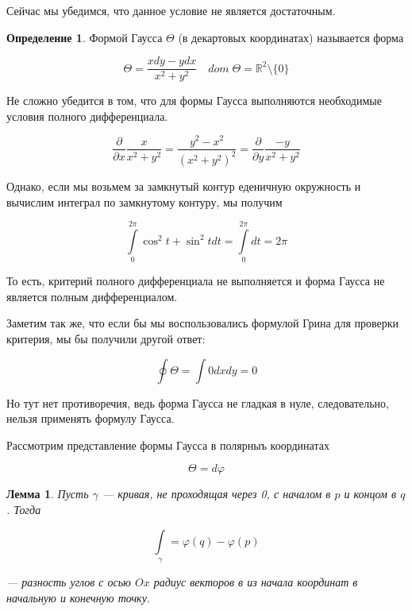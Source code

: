 \documentclass[a5paper]{article}
\newcounter{through}
\theoremstyle{plain}
\newtheorem{lemma}[through]{Лемма}
\theoremstyle{definition}
\newtheorem{definition}[through]{Определение}
\numberwithin{through}{section}
\numberwithin{equation}{section}
\begin{document}
Сейчас мы убедимся, что данное условие не является достаточным.

\begin{definition}
	Формой Гаусса $\Theta$ (в декартовых координатах) называется форма
	
	\begin{equation*}
		\Theta = \frac{xdy - ydx}{x^2 + y^2} \quad dom \; \Theta = \mathbb{R}^2 \setminus \{0\}
	\end{equation*}	
\end{definition}

Не сложно убедится в том, что для формы Гаусса выполняются необходимые условия полного дифференциала.

\begin{equation*}
	\frac{\partial}{\partial x} \frac{x}{x^2 + y^2} = \frac{y^2 - x^2}{(x^2 + y^2)^2} = \frac{\partial}{\partial y} \frac{-y}{x^2 + y^2}
\end{equation*}

Однако, если мы возьмем за замкнутый контур еденичную окружность и вычислим интеграл по замкнутому контуру, мы получим

\begin{equation*}
	\int\limits_{0}^{2 \pi} \cos^2 t+ \sin^2 t dt = \int\limits_{0}^{2 \pi }dt = 2 \pi
\end{equation*}

То есть, критерий полного дифференциала не выполняется и форма Гаусса не является полным дифференциалом.

Заметим так же, что если бы мы воспользовались формулой Грина для проверки критерия, мы бы получили другой ответ:

\begin{equation*}
	\oint\limits \Theta = \int 0 dx dy = 0
\end{equation*}

Но тут нет противоречия, ведь форма Гаусса не гладкая в нуле, следовательно, нельзя применять формулу Гаусса. 

Рассмотрим представление формы Гаусса в полярныъ координатах

\begin{equation*}
	\Theta = d \varphi
\end{equation*}

\begin{lemma}
	Пусть $\gamma$ --- кривая, не проходящая через 0, с началом в $p$ и концом в $q$. Тогда 
	
	\begin{equation*}
		\int\limits_{\gamma} = \varphi(q) - \varphi(p)
	\end{equation*}
	
	--- разность углов с осью $Ox$ радиус векторов в из начала координат в начальную и конечную точку.
\end{lemma} 
\end{document}
